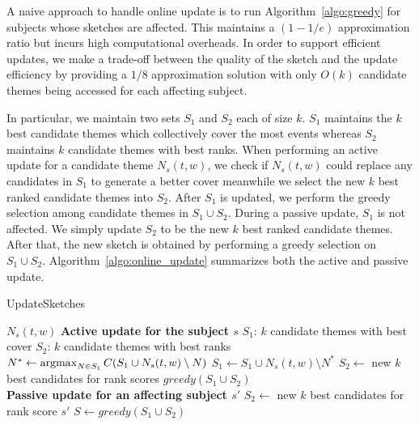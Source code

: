 A naive approach to handle online update is to run Algorithm~\ref{algo:greedy} for subjects whose sketches are affected.
This maintains a $(1-1/e)$ approximation ratio but incurs high computational overheads. In order to support efficient updates, we make a trade-off between the quality of the sketch and the update efficiency by providing a $1/8$ approximation solution with only $O(k)$ candidate themes being accessed for each affecting subject. 

In particular, we maintain two sets $S_1$ and $S_2$ each of size $k$. 
$S_1$ maintains the $k$ best candidate themes which collectively cover the most
events whereas $S_2$ maintains $k$ candidate themes with best ranks. When performing an active update for a candidate theme $N_s(t,w)$, we check if $N_s(t,w)$ could replace any candidates in $S_1$ to generate a better cover meanwhile we select the new $k$ best ranked candidate themes into $S_2$. After $S_1$ is updated, we perform the greedy selection among candidate themes in $S_1 \cup S_2$.
During a passive update, $S_1$ is not affected. We simply update $S_2$ to be the new $k$ best ranked candidate themes. 
After that, the new sketch is obtained by performing a greedy selection on $S_1 \cup S_2$. Algorithm~\ref{algo:online_update} summarizes both the active and passive update. 
%
\begin{algorithm}
\caption{UpdateSketches}\label{algo:online_update}
\begin{algorithmic} [1]
\Require $N_s(t,w)$
\State \textbf{Active update for the subject $s$}
\State $S_1$:  $k$ candidate themes with best cover
\State $S_2$:  $k$ candidate themes with best ranks 
\State $N^* \gets \operatorname*{argmax}_{N \in S_1}C(S_1 \cup N_s(t,w) \setminus N)$
\State $S_1 \gets S_1 \cup N_s(t,w) \setminus N^*$
\EndIf
\State $S_2 \gets$ new $k$ best candidates for rank scores 
\State $greedy(S_1 \cup S_2 )$
\\\hrulefill
\State \textbf{Passive update for an affecting subject $s'$}
\State $S_2 \gets$ new $k$ best candidates for rank score $s'$ 
\State $S \gets greedy(S_1 \cup S_2)$
\end{algorithmic}
\end{algorithm}
  
